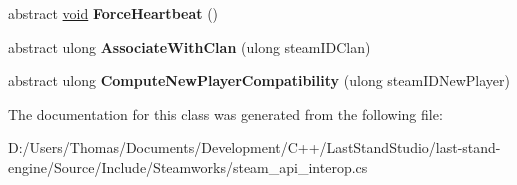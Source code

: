 \begin{DoxyCompactItemize}
\item 
\hypertarget{classValve_1_1Steamworks_1_1ISteamGameServer_adcade9a8bdbfbf355ea5dce054eab338}{}abstract \hyperlink{SDL__audio_8h_a52835ae37c4bb905b903cbaf5d04b05f}{void} {\bfseries Force\+Heartbeat} ()\label{classValve_1_1Steamworks_1_1ISteamGameServer_adcade9a8bdbfbf355ea5dce054eab338}

\item 
\hypertarget{classValve_1_1Steamworks_1_1ISteamGameServer_ac8e95c89d3f26003ffd940944adb223b}{}abstract ulong {\bfseries Associate\+With\+Clan} (ulong steam\+I\+D\+Clan)\label{classValve_1_1Steamworks_1_1ISteamGameServer_ac8e95c89d3f26003ffd940944adb223b}

\item 
\hypertarget{classValve_1_1Steamworks_1_1ISteamGameServer_a608a36b08d96f197aca2076d823e0919}{}abstract ulong {\bfseries Compute\+New\+Player\+Compatibility} (ulong steam\+I\+D\+New\+Player)\label{classValve_1_1Steamworks_1_1ISteamGameServer_a608a36b08d96f197aca2076d823e0919}

\end{DoxyCompactItemize}


The documentation for this class was generated from the following file\+:\begin{DoxyCompactItemize}
\item 
D\+:/\+Users/\+Thomas/\+Documents/\+Development/\+C++/\+Last\+Stand\+Studio/last-\/stand-\/engine/\+Source/\+Include/\+Steamworks/steam\+\_\+api\+\_\+interop.\+cs\end{DoxyCompactItemize}
